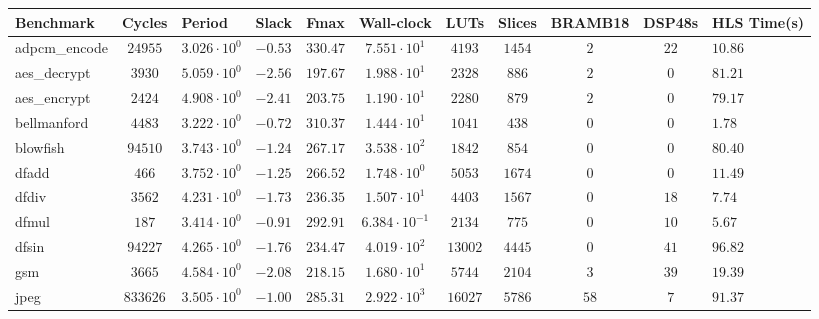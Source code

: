 \begin{tabular}{|l|c|HHc|c|c|c|c|cH|}
\hline
Benchmark     & Cycles       & Period                 & Slack     & Fmax       & Wall-clock              & LUTs      & Slices    & BRAMB18 & DSP48s  & HLS Time(s) \\
\hline
adpcm\_encode & $ 24955    $ & $ 3.026 \cdot 10^{0} $ & $ -0.53 $ & $ 330.47 $ & $ 7.551 \cdot 10^{1}  $ & $ 4193  $ & $ 1454  $ & $ 2   $ & $ 22  $ & $ 10.86   $ \\
aes\_decrypt  & $ 3930     $ & $ 5.059 \cdot 10^{0} $ & $ -2.56 $ & $ 197.67 $ & $ 1.988 \cdot 10^{1}  $ & $ 2328  $ & $ 886   $ & $ 2   $ & $ 0   $ & $ 81.21   $ \\
aes\_encrypt  & $ 2424     $ & $ 4.908 \cdot 10^{0} $ & $ -2.41 $ & $ 203.75 $ & $ 1.190 \cdot 10^{1}  $ & $ 2280  $ & $ 879   $ & $ 2   $ & $ 0   $ & $ 79.17   $ \\
bellmanford   & $ 4483     $ & $ 3.222 \cdot 10^{0} $ & $ -0.72 $ & $ 310.37 $ & $ 1.444 \cdot 10^{1}  $ & $ 1041  $ & $ 438   $ & $ 0   $ & $ 0   $ & $ 1.78    $ \\
blowfish      & $ 94510    $ & $ 3.743 \cdot 10^{0} $ & $ -1.24 $ & $ 267.17 $ & $ 3.538 \cdot 10^{2}  $ & $ 1842  $ & $ 854   $ & $ 0   $ & $ 0   $ & $ 80.40   $ \\
dfadd         & $ 466      $ & $ 3.752 \cdot 10^{0} $ & $ -1.25 $ & $ 266.52 $ & $ 1.748 \cdot 10^{0}  $ & $ 5053  $ & $ 1674  $ & $ 0   $ & $ 0   $ & $ 11.49   $ \\
dfdiv         & $ 3562     $ & $ 4.231 \cdot 10^{0} $ & $ -1.73 $ & $ 236.35 $ & $ 1.507 \cdot 10^{1}  $ & $ 4403  $ & $ 1567  $ & $ 0   $ & $ 18  $ & $ 7.74    $ \\
dfmul         & $ 187      $ & $ 3.414 \cdot 10^{0} $ & $ -0.91 $ & $ 292.91 $ & $ 6.384 \cdot 10^{-1} $ & $ 2134  $ & $ 775   $ & $ 0   $ & $ 10  $ & $ 5.67    $ \\
dfsin         & $ 94227    $ & $ 4.265 \cdot 10^{0} $ & $ -1.76 $ & $ 234.47 $ & $ 4.019 \cdot 10^{2}  $ & $ 13002 $ & $ 4445  $ & $ 0   $ & $ 41  $ & $ 96.82   $ \\
gsm           & $ 3665     $ & $ 4.584 \cdot 10^{0} $ & $ -2.08 $ & $ 218.15 $ & $ 1.680 \cdot 10^{1}  $ & $ 5744  $ & $ 2104  $ & $ 3   $ & $ 39  $ & $ 19.39   $ \\
jpeg          & $ 833626   $ & $ 3.505 \cdot 10^{0} $ & $ -1.00 $ & $ 285.31 $ & $ 2.922 \cdot 10^{3}  $ & $ 16027 $ & $ 5786  $ & $ 58  $ & $ 7   $ & $ 91.37   $ \\

\end{tabular}
